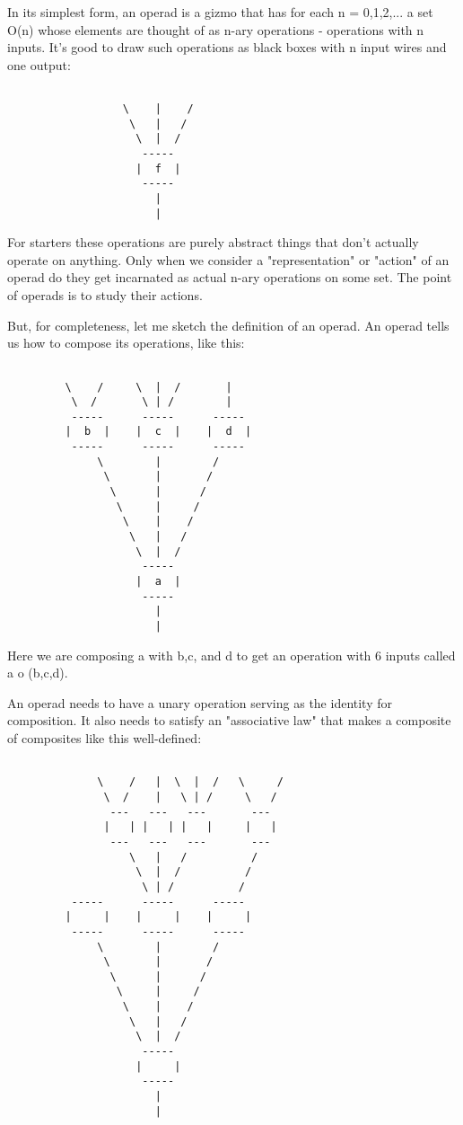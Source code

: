 In its simplest form, an operad is a gizmo that has for each 
n = 0,1,2,... a set O(n) whose elements are thought of as n-ary 
operations - operations with n inputs.  It's good to draw such 
operations as black boxes with n input wires and one output:  


\begin{verbatim}

                  \    |    /
                   \   |   / 
                    \  |  /
                     -----
                    |  f  | 
                     -----
                       |
                       |
\end{verbatim}
    
For starters these operations are purely abstract things that
don't actually operate on anything.  Only when we consider a
"representation" or "action" of an operad do they get incarnated
as actual n-ary operations on some set.   The point of operads is 
to study their actions. 

But, for completeness, let me sketch the definition of an operad.
An operad tells us how to compose its operations, like this:


\begin{verbatim}

         \    /     \  |  /       | 
          \  /       \ | /        |
          -----      -----      -----
         |  b  |    |  c  |    |  d  |
          -----      -----      -----
              \        |        /  
               \       |       /
                \      |      /
                 \     |     /
                  \    |    / 
                   \   |   /  
                    \  |  /
                     -----
                    |  a  | 
                     -----
                       |
                       |
\end{verbatim}
    
Here we are composing a with b,c, and d to get an operation with 6 
inputs called a o (b,c,d).

An operad needs to have a unary operation serving as the identity 
for composition.  It also needs to satisfy an "associative law" 
that makes a composite of composites like this well-defined:



\begin{verbatim}

              \    /   |  \  |  /   \     / 
               \  /    |   \ | /     \   / 
                ---   ---   ---       ---
               |   | |   | |   |     |   |
                ---   ---   ---       ---
                   \   |   /          /
                    \  |  /          / 
                     \ | /          / 
          -----      -----      -----
         |     |    |     |    |     |
          -----      -----      -----
              \        |        /  
               \       |       /   
                \      |      /
                 \     |     / 
                  \    |    / 
                   \   |   /   
                    \  |  /
                     -----
                    |     | 
                     -----
                       |
                       |
\end{verbatim}
    

